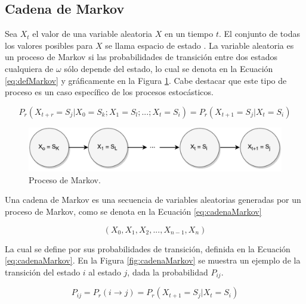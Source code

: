 \subsection{Cadena de Markov}
Sea $X_t$ el valor de una variable aleatoria $X$ en un tiempo $t$. El conjunto de todas los valores posibles para $X$ se llama espacio de estado \citep{ching2006markov}. La variable aleatoria es un proceso de Markov si las probabilidades de transición entre dos estados cualquiera de $\omega$ sólo depende del estado, lo cual se denota en la Ecuación \ref{eq:defMarkov} y gráficamente en la Figura \ref{fig:procesoMarkov}. Cabe destacar que este tipo de proceso es un caso específico de los procesos estocásticos.

\begin{equation} \label{eq:defMarkov} 
	P_r(X_{t+r} = S_j | X_0 = S_k ; X_1 = S_l ; ... ; X_t = S_i) = P_r(X_{t+1} = S_j | X_t = S_i)
\end{equation}

\begin{figure}[ht!]
  \centering
    \includegraphics[scale=0.6]{images/ProcesoMarkov.pdf}
  \caption{Proceso de Markov.}
  \label{fig:procesoMarkov}
\end{figure}

Una cadena de Markov es una secuencia de variables aleatorias generadas por un proceso de Markov, como se denota en la Ecuación \ref{eq:cadenaMarkov}

\begin{equation} \label{eq:cadenaMarkov}
	(X_0, X_1, X_2, ..., X_{n-1}, X_{n})
\end{equation}

La cual se define por sus probabilidades de transición, definida en la Ecuación \ref{eq:cadenaMarkov}. En la Figura \ref{fig:cadenaMarkov} se muestra un ejemplo de la transición del estado $i$ al estado $j$, dada la probabilidad $P_{ij}$.

\begin{equation} \label{eq:transicionMarkov}
	P_{ij} = P_r(i \rightarrow j) = P_r(X_{t+1} = S_j | X_t = S_i)
\end{equation}

